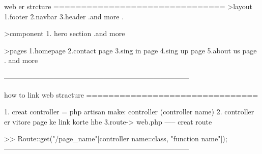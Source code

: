 
web er strcture
===============================
>layout
  1.footer
  2.navbar
  3.header
  .and more
  .

>component
 1. hero section
 .and more

>pages
 1.homepage
 2.contact page
 3.sing in page
 4.sing up page
 5.about us page
 . and more

------------------------------------------------------------------------------

how to link  web stracture
===============================

1. creat controller  =  php artisan make: controller (controller name)
2. controller er vitore page ke link korte hbe
3.route-> web.php ----- creat route

 >> Route::get("/page_name"[controller name::class, "function name"]);
------------------------------------------------------------------------------
